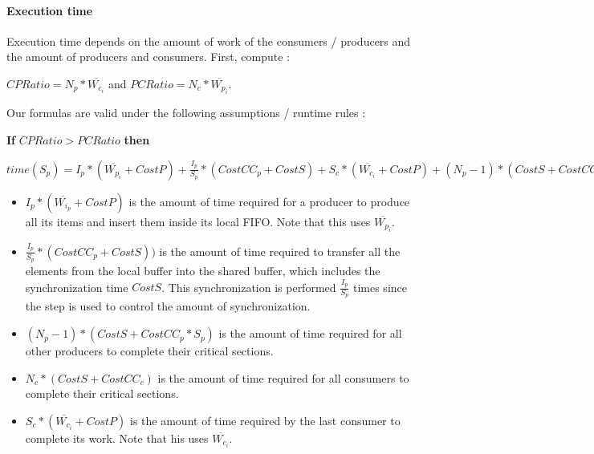 \documentclass[a4paper,11pt]{article}
\begin{document}
\paragraph{Execution time}
Execution time depends on the amount of work of the consumers / producers and the amount of producers and consumers. First, compute : 
\medskip

    $ CPRatio = N_p * \overline{W_{c_i}} $ and $ PCRatio = N_c * \overline{W_{p_i}} $.

    \medskip

    Our formulas are valid under the following assumptions / runtime rules : 

    \begin{center}
    \end{center}

        \medskip
\noindent \textbf{If} $ CPRatio > PCRatio $ \textbf{then}

    $ time(S_p) = I_p * (\overline{W_{p_i}} + CostP) + \frac{I_p}{S_p} * (CostCC_p + CostS) + S_c * (\overline{W_{c_i}} + CostP) + (N_p - 1) * (CostS + CostCC_p * S_p) + N_c * (CostS + CostCC_c) $

    \begin{itemize}
        \item $ I_p * (\overline{W_{i_p}} + CostP) $ is the amount of time required for a producer to produce all its items and insert them inside its local FIFO. Note that this uses $ \overline{W_{p_i}} $.
        \item $ \frac{I_p}{S_p} * (CostCC_p + CostS)) $ is the amount of time required to transfer all the elements from the local buffer into the shared buffer, which includes the synchronization time $ CostS $. This synchronization is performed $ \frac{I_p}{S_p} $ times since the step is used to control the amount of synchronization.
        \item $ (N_p - 1) * (CostS + CostCC_p * S_p) $ is the amount of time required for all other producers to complete their critical sections.
        \item $ N_c * (CostS + CostCC_c) $ is the amount of time required for all consumers to complete their critical sections.
        \item $ S_c * (\overline{W_{c_i}} + CostP) $ is the amount of time required by the last consumer to complete its work. Note that his uses $ \overline{W_{c_i}} $.
    \end{itemize}
\end{document}
